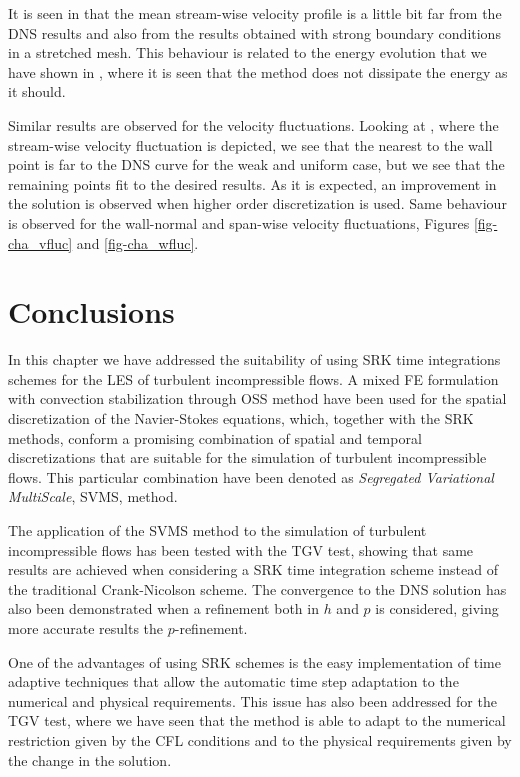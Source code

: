 It is seen in  that the mean stream-wise velocity profile is a little bit far from the DNS results and also from the results obtained with strong boundary conditions in a stretched mesh. This behaviour is related to the energy evolution that we have shown in , where it is seen that the method does not dissipate the energy as it should.

%
Similar results are observed for the velocity fluctuations. Looking at , where the stream-wise velocity fluctuation is depicted, we see that the nearest to the wall point is far to the DNS curve for the weak and uniform case, but we see that the remaining points fit to the desired results. As it is expected, an improvement in the solution is observed when higher order discretization is used. Same behaviour is observed for the wall-normal and span-wise velocity fluctuations, Figures \ref{fig-cha_vfluc} and \ref{fig-cha_wfluc}.

\section{Conclusions}
\label{sec-C7_conclusions}
In this chapter we have addressed the suitability of using SRK time integrations schemes for the LES of turbulent incompressible flows. A mixed FE formulation with convection stabilization through OSS method have been used for the spatial discretization of the Navier-Stokes equations, which, together with the SRK methods, conform a promising combination of spatial and temporal discretizations that are suitable for the simulation of turbulent incompressible flows. This particular combination have been denoted as \textit{Segregated Variational MultiScale}, SVMS, method.

The application of the SVMS method to the simulation of turbulent incompressible flows has been tested with the TGV test, showing that same results are achieved when considering a SRK time integration scheme instead of the traditional Crank-Nicolson scheme. The convergence to the DNS solution has also been demonstrated when a refinement both in $ h $ and $ p $ is considered, giving more accurate results the $ p $-refinement.

One of the advantages of using SRK schemes is the easy implementation of time adaptive techniques that allow the automatic time step adaptation to the numerical and physical requirements. This issue has also been addressed for the TGV test, where we have seen that the method is able to adapt to the numerical restriction given by the CFL conditions and to the physical requirements given by the change in the solution.

